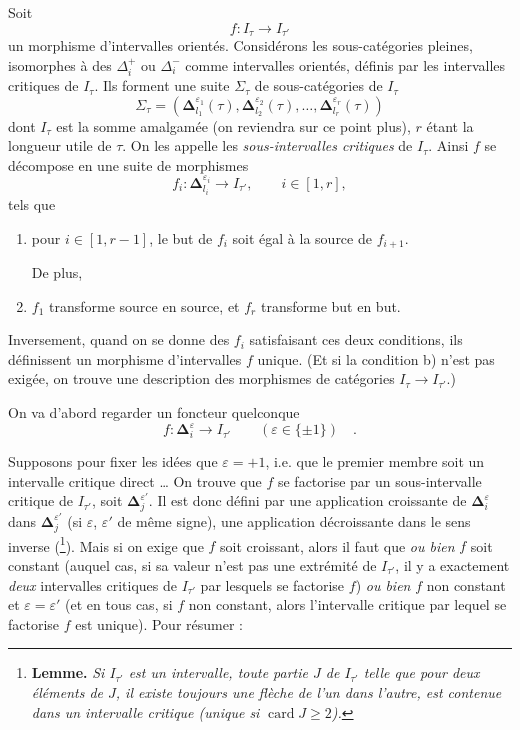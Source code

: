 \documentclass[11pt]{article}
\newcommand{\printedpage}[1]{\marginpar{\footnotesize p.~#1}}
\newcommand{\msp}[1]{\marginpar{\footnotesize [#1]}}
\newcommand{\bDelta}{\boldsymbol{\Delta}}
\begin{document}
\msp{page 32}
Soit
\[
f : I_\tau\longrightarrow I_{\tau'}
\]
un morphisme d'intervalles orientés. Considérons les sous-catégories pleines, isomorphes à des $\Delta_i^+$ ou $\Delta_i^-$ comme intervalles orientés, définis par les intervalles critiques de $I_\tau$. Ils forment une suite $\Sigma_\tau$ de sous-catégories de $I_\tau$
\[
\Sigma_\tau=(\bDelta^{\varepsilon_1}_{l_1}(\tau),\bDelta^{\varepsilon_2}_{l_2}(\tau),\ldots,\bDelta^{\varepsilon_r}_{l_r}(\tau))
\]
dont $I_\tau$ est la somme amalgamée (on reviendra sur ce point plus), $r$ étant la longueur utile de $\tau$. On les appelle les \textit{sous-intervalles critiques} de $I_\tau$. Ainsi $f$ se décompose en une suite de morphismes
\[
f_i : \bDelta^{\varepsilon_i}_{l_i}\longrightarrow I_{\tau'},\qquad i\in[1,r],
\]
tels que
\begin{enumerate}
\item[a)] pour $i\in[1,r-1]$, le but de $f_i$ soit égal à la source de $f_{i+1}$.

De plus,
\item[b)] $f_1$ transforme source en source, et $f_r$ transforme but en but.
\end{enumerate}

Inversement, quand on se donne des $f_i$ satisfaisant ces deux conditions, ils définissent un morphisme d'intervalles $f$ unique. (Et si la condition b) n'est pas exigée, on trouve une description des morphismes de catégories $I_\tau\longrightarrow I_{\tau'}$.)

\msp{page 33}
On va d'abord regarder un foncteur quelconque
\[
f : \bDelta^{\varepsilon}_i\longrightarrow I_{\tau'}\qquad(\varepsilon\in\{\pm1\})\quad .
\]

\printedpage{22}
Supposons pour fixer les idées que $\varepsilon=+1$, i.e. que le premier membre soit un intervalle critique direct \ldots{} On trouve que $f$ se factorise par un sous-intervalle critique de $I_{\tau'}$, soit $\bDelta^{\varepsilon'}_j$. Il est donc défini par une application croissante de $\bDelta^{\varepsilon}_i$ dans $\bDelta^{\varepsilon'}_j$ (si $\varepsilon$, $\varepsilon'$ de même signe), une application décroissante dans le sens inverse (\footnote[11]{\textbf{Lemme.} \textit{Si $I_{\tau'}$ est un intervalle, toute partie $J$ de $I_{\tau'}$ telle que pour deux éléments de $J$, il existe toujours une flèche de l'un dans l'autre, est contenue dans un intervalle critique (unique si} $\operatorname{card} J\geq 2$\textit{).}}). Mais si on exige que $f$ soit croissant, alors il faut que \textit{ou bien} $f$ soit constant (auquel cas, si sa valeur n'est pas une extrémité de $I_{\tau'}$, il y a exactement \textit{deux} intervalles critiques de $I_{\tau'}$ par lesquels se factorise $f$) \textit{ou bien} $f$ non constant et $\varepsilon=\varepsilon'$ (et en tous cas, si $f$ non constant, alors l'intervalle critique par lequel se factorise $f$ est unique). Pour résumer :
\end{document}
